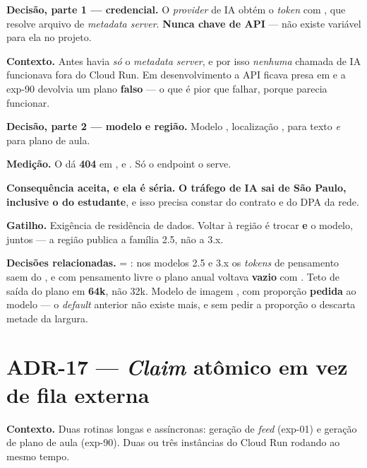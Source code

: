\textbf{Decisão, parte 1 --- credencial.} O \emph{provider} de IA obtém o
\emph{token} com , que resolve
 \seta{} arquivo de
 \seta{} \emph{metadata server}.
\textbf{Nunca chave de API} --- não existe variável para ela no projeto.

\textbf{Contexto.} Antes havia \emph{só} o \emph{metadata server}, e por isso
\emph{nenhuma} chamada de IA funcionava fora do Cloud Run. Em desenvolvimento a
API ficava presa em  e a exp-90 devolvia um plano \textbf{falso} --- o
que é pior que falhar, porque parecia funcionar.

\textbf{Decisão, parte 2 --- modelo e região.} Modelo ,
localização , para texto \emph{e} para plano de aula.

\textbf{Medição.} O  dá \textbf{404} em ,
 e . Só o endpoint  o serve.

\textbf{Consequência aceita, e ela é séria.} \textbf{O tráfego de IA sai de São
Paulo, inclusive o do estudante}, e isso precisa constar do contrato e do DPA da rede.

\textbf{Gatilho.} Exigência de residência de dados. Voltar à região é trocar
 \textbf{e} o modelo, juntos --- a região publica a família
2.5, não a 3.x.

\textbf{Decisões relacionadas.}  = : nos
modelos 2.5 e 3.x os \emph{tokens} de pensamento saem do , e
com pensamento livre o plano anual voltava \textbf{vazio} com
. Teto de saída do plano em \textbf{64k}, não 32k.
Modelo de imagem , com proporção 
\textbf{pedida} ao modelo --- o \emph{default} anterior não existe mais, e sem
pedir a proporção o  descarta metade da largura.

\section{ADR-17 --- \emph{Claim} atômico em vez de fila externa}

\textbf{Contexto.} Duas rotinas longas e assíncronas: geração de \emph{feed}
(exp-01) e geração de plano de aula (exp-90). Duas ou três instâncias do Cloud Run
rodando ao mesmo tempo.

